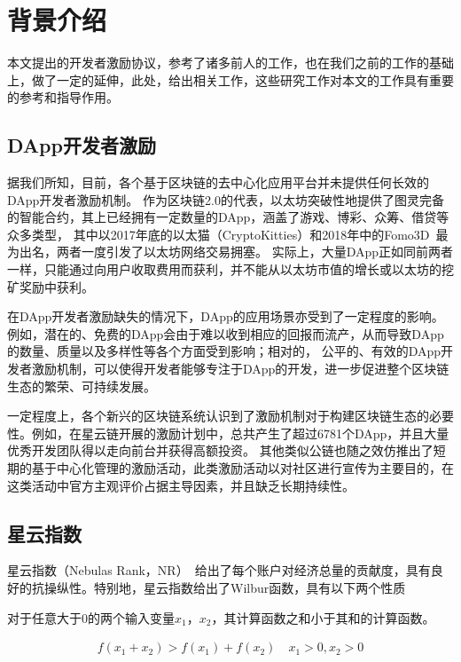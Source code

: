 \section{背景介绍}
本文提出的开发者激励协议，参考了诸多前人的工作，也在我们之前的工作的基础上，做了一定的延伸，此处，给出相关工作，这些研究工作对本文的工作具有重要的参考和指导作用。

\subsection{DApp开发者激励}
据我们所知，目前，各个基于区块链的去中心化应用平台并未提供任何长效的DApp开发者激励机制。
作为区块链2.0的代表，以太坊突破性地提供了图灵完备的智能合约，其上已经拥有一定数量的DApp，涵盖了游戏、博彩、众筹、借贷等众多类型，
其中以2017年底的以太猫（CryptoKitties）和2018年中的Fomo3D~\cite{Fomo3D}最为出名，两者一度引发了以太坊网络交易拥塞。
实际上，大量DApp正如同前两者一样，只能通过向用户收取费用而获利，并不能从以太坊市值的增长或以太坊的挖矿奖励中获利。

在DApp开发者激励缺失的情况下，DApp的应用场景亦受到了一定程度的影响。例如，潜在的、免费的DApp会由于难以收到相应的回报而流产，从而导致DApp的数量、质量以及多样性等各个方面受到影响；相对的，
公平的、有效的DApp开发者激励机制，可以使得开发者能够专注于DApp的开发，进一步促进整个区块链生态的繁荣、可持续发展。

一定程度上，各个新兴的区块链系统认识到了激励机制对于构建区块链生态的必要性。例如，在星云链开展的激励计划中，总共产生了超过6781个DApp，并且大量优秀开发团队得以走向前台并获得高额投资\cite{Nebulasincentive}。
其他类似公链也随之效仿推出了短期的基于中心化管理的激励活动，此类激励活动以对社区进行宣传为主要目的，在这类活动中官方主观评价占据主导因素，并且缺乏长期持续性。

\subsection{星云指数}
星云指数（Nebulas Rank，NR）~\cite{Nebulasyellowpaper}给出了每个账户对经济总量的贡献度，具有良好的抗操纵性。特别地，星云指数给出了Wilbur函数，具有以下两个性质
\begin{property}
\label{prop:one}
对于任意大于$0$的两个输入变量$x_1$，$x_2$，其计算函数之和小于其和的计算函数。
\end{property}
\begin{align}
f(x_1+x_2)>f(x_1)+f(x_2) \quad x_1>0,x_2>0
\end{align}

